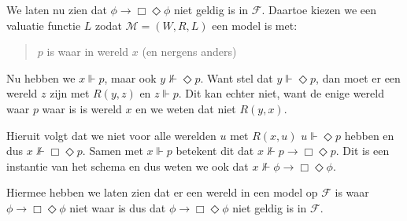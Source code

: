\documentclass[a4paper,11pt]{article}
\begin{document}
\begin{description}
We laten nu zien dat $\phi \rightarrow \Box \Diamond \phi$ niet geldig is in
$\mathcal{F}$. Daartoe kiezen we een valuatie functie $L$ zodat
$\mathcal{M} = (W, R, L)$ een model is met:
\begin{quote}
$p$ is waar in wereld $x$ (en nergens anders)
\end{quote}

Nu hebben we $x \Vdash p$, maar ook $y \not \Vdash \Diamond p$. Want stel dat
$y \Vdash \Diamond p$, dan moet er een wereld $z$ zijn met $R(y, z)$ en
$z \Vdash p$. Dit kan echter niet, want de enige wereld waar $p$ waar is is
wereld $x$ en we weten dat niet $R(y, x)$.

Hieruit volgt dat we niet voor alle werelden $u$ met $R(x, u)$
$u \Vdash \Diamond p$ hebben en dus $x \not \Vdash \Box \Diamond p$. Samen met
$x \Vdash p$ betekent dit dat $x \not \Vdash p \rightarrow \Box \Diamond p$.
Dit is een instantie van het schema en dus weten we ook dat
$x \not \Vdash \phi \rightarrow \Box \Diamond \phi$.

Hiermee hebben we laten zien dat er een wereld in een model op $\mathcal{F}$
is waar $\phi \rightarrow \Box \Diamond \phi$ niet waar is dus dat
$\phi \rightarrow \Box \Diamond \phi$ niet geldig is in $\mathcal{F}$.

\end{description}
\end{document}

